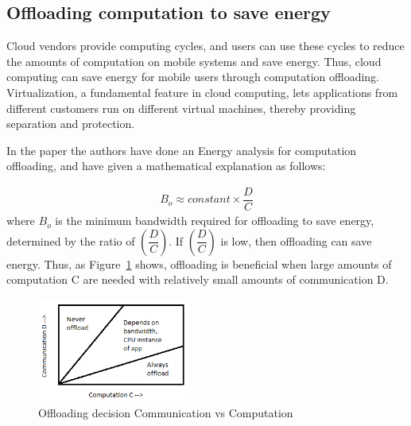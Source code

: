 \documentclass{article}
\begin{document}
\subsection{Offloading computation to save energy}
Cloud vendors provide computing cycles, and users
can use these cycles to reduce the amounts of computation
on mobile systems and save energy. Thus, cloud computing can save energy for mobile users through computation
offloading. Virtualization, a fundamental feature in cloud computing, lets applications from different customers run
on different virtual machines, thereby providing separation and protection.\par
In the paper \cite{kumar2010cloud} the authors have done an Energy analysis for computation offloading, and have given a mathematical explanation as follows:

    \begin{align*}
      B_o \approx constant \times \dfrac{D}{C}
    \end{align*}
where $B_o$ is the minimum bandwidth required for offloading to save energy, determined by the ratio of $(\dfrac{D}{C})$. If $(\dfrac{D}{C})$
is low, then offloading can save energy. Thus, as Figure~\ref{fig:offload_pic} shows, offloading is beneficial when large amounts of
computation C are needed with relatively small amounts
of communication D.
\begin{figure}[h]
  \centering
  \includegraphics[width=2in]{offload_pic.png}
  \caption{Offloading decision Communication vs Computation}
  \label{fig:offload_pic}
\end{figure}
\end{document}
